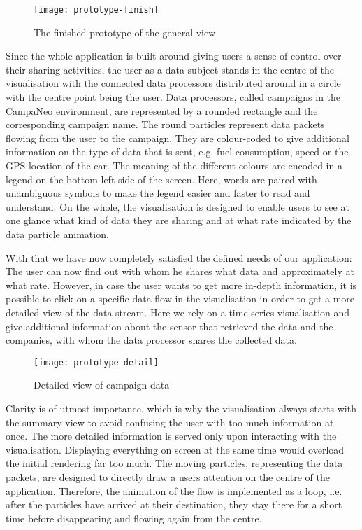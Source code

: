 \documentclass[../paper.tex]{subfiles}
\begin{document}
  \begin{figure}[H]
    \centering
    \texttt{[image: prototype-finish]}
    \caption{The finished prototype of the general view}
    \label{fig:prototype-finish}
  \end{figure}

  Since the whole application is built around giving users a sense of control
  over their sharing activities, the user as a data subject stands in the centre of
  the visualisation with the connected data processors distributed around in a
  circle with the centre point
  being the user. Data processors, called campaigns in the CampaNeo environment, are
  represented by a rounded rectangle and the corresponding campaign name. The round
  particles represent data packets flowing from the user to the campaign. They are
  colour-coded to give additional information on the type of data that is sent,
  e.g. fuel consumption, speed or the GPS location of the car.
  The meaning of the different colours are encoded in a legend on the bottom left
  side of the screen. Here, words are paired with unambiguous symbols to make the
  legend easier and faster to read and understand. On the whole, the visualisation
  is designed to enable users to see at one glance what kind of data they are sharing
  and at what rate indicated by the data particle animation.

  With that we have now completely satisfied the defined needs of our application:
  The user can now find out with whom he shares what data and approximately at what
  rate. However, in case the user wants to get more in-depth information, it is
  possible to click on a specific data flow in the visualisation in order
  to get a more detailed view of the data stream. Here we rely on a time series
  visualisation and give additional information about the sensor that retrieved
  the data and the companies, with whom the data processor shares the collected data.
  
\begin{figure}[H]
    \centering
    \texttt{[image: prototype-detail]}
    \caption{Detailed view of campaign data}
    \label{fig:prototype-detail}
  \end{figure}
%
% 
  Clarity is of utmost importance, which is why the visualisation always starts
  with the summary view to avoid confusing the user with too much information
  at once. The more detailed information is served only upon interacting with
  the visualisation. Displaying everything on screen at the same time would
  overload the initial rendering far too much. The moving particles, representing the
  data packets, are designed to directly draw a users attention on the centre of the
  application. Therefore, the animation of the flow is implemented as a loop, i.e.
  after the particles have arrived at their destination, they stay there for a short
  time before disappearing and flowing again from the centre.
\end{document}
